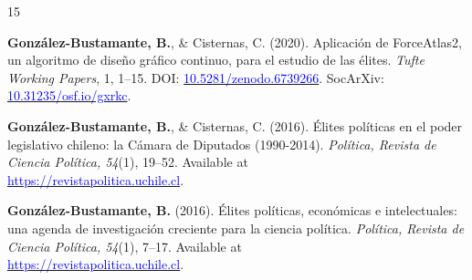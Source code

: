 \begin{publications}
\begin{benumerate}{15}
\item{{\bfseries González-Bustamante, B.}, \& Cisternas, C. (2020). Aplicación de ForceAtlas2, un algoritmo de diseño gráfico continuo, para el estudio de las élites. {\itshape Tufte Working Papers}, 1, 1--15. DOI: \href{https://doi.org/10.5281/zenodo.6739266}{\textcolor{blue}{10.5281/zenodo.6739266}}. SocArXiv: \href{https://doi.org/10.31235/osf.io/gxrkc}{\textcolor{blue}{10.31235/osf.io/gxrkc}}.}\vspace{1mm}


\item{{\bfseries González-Bustamante, B.}, \& Cisternas, C. (2016). Élites políticas en el poder legislativo chileno: la Cámara de Diputados (1990-2014). {\itshape Política, Revista de Ciencia Política, 54}(1), 19--52. Available at \\ \href{https://revistapolitica.uchile.cl/index.php/RP/article/view/42691}{\textcolor{blue}{https://revistapolitica.uchile.cl}}.}\vspace{1mm}


\item{{\bfseries González-Bustamante, B.} (2016). Élites políticas, económicas e intelectuales: una agenda de investigación creciente para la ciencia política. {\itshape Política, Revista de Ciencia Política, 54}(1), 7--17. Available at \\ \href{https://revistapolitica.uchile.cl/index.php/RP/article/view/42690}{\textcolor{blue}{https://revistapolitica.uchile.cl}}.}\vspace{1mm}


\end{benumerate}
\end{publications}

